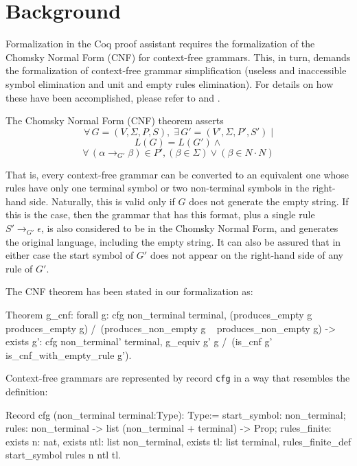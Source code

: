 \documentclass {elsarticle}
\begin{document}
\section {Background}
\label {sec-background}

Formalization in the Coq proof assistant requires the formalization of the Chomsky Normal Form (CNF) for context-free grammars. This, in turn, demands the formalization of context-free grammar simplification (useless and inaccessible symbol elimination and unit and empty rules elimination). For details on how these have been accomplished, please refer to \cite {ramos-2015} and \cite {ramos-2016}. 

The Chomsky Normal Form (CNF) theorem asserts 
$$\forall\,G=(V,\Sigma,P,S),\;\exists\,G'=(V',\Sigma,P',S')\;|$$
$$L(G)=L(G') \land$$
$$\forall\,(\alpha \rightarrow_{G'} \beta) \in P', (\beta \in \Sigma) \lor (\beta \in N\cdot N)$$

That is, every context-free grammar can be converted to an equivalent one whose rules have only one terminal symbol or two non-terminal symbols in the right-hand side. Naturally, this is valid only if $G$ does not generate the empty string. If this is the case, then the grammar that has this format, plus a single rule $S' \rightarrow_{G'} \epsilon$, is also considered to be in the Chomsky Normal Form, and generates the original language, including the empty string. It can also be assured that in either case the start symbol of $G'$ does not appear on the right-hand side of any rule of $G'$.

The CNF theorem has been stated in our formalization as:

\begin{coq}
Theorem g_cnf:
forall g: cfg non_terminal terminal,
(produces_empty g \/ ~ produces_empty g) /\ 
(produces_non_empty g \/ ~ produces_non_empty g) ->
exists g': cfg non_terminal' terminal, 
g_equiv g' g /\ 
(is_cnf g' \/ is_cnf_with_empty_rule g').
\end{coq}

Context-free grammars are represented by record \texttt {cfg} in a way that resembles the definition:

\begin{coq}
Record cfg (non_terminal terminal:Type): Type:= {
start_symbol: non_terminal;
rules: non_terminal -> list (non_terminal + terminal) -> Prop;
rules_finite:
         exists n: nat,
         exists ntl: list non_terminal,
         exists tl: list terminal,
         rules_finite_def start_symbol rules n ntl tl}.
\end{coq}
\end{document}
